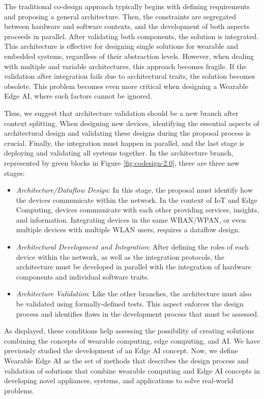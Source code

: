 The traditional co-design approach typically begins with defining requirements and proposing a general architecture. Then, the constraints are segregated between hardware and software contexts, and the development of both aspects proceeds in parallel. After validating both components, the solution is integrated. This architecture is effective for designing single solutions for wearable and embedded systems, regardless of their abstraction levels. However, when dealing with multiple and variable architectures, this approach becomes fragile. If the validation after integration fails due to architectural traits, the solution becomes obsolete. This problem becomes even more critical when designing a Wearable Edge AI, where such factors cannot be ignored.

Thus, we suggest that architecture validation should be a new branch after context splitting. When designing new devices, identifying the essential aspects of architectural design and validating these designs during the proposal process is crucial. Finally, the integration must happen in parallel, and the last stage is deploying and validating all systems together. In the architecture branch, represented by green blocks in Figure \ref{fig:codesign-2.0}, there are three new stages:

\begin{itemize}
    \item \textit{Architecture/Dataflow Design}: In this stage, the proposal must identify how the devices communicate within the network. In the context of IoT and Edge Computing, devices communicate with each other providing services, insights, and information. Integrating devices in the same WBAN/WPAN, or even multiple devices with multiple WLAN users, requires a dataflow design.
    \item \textit{Architectural Development and Integration}: After defining the roles of each device within the network, as well as the integration protocols, the architecture must be developed in parallel with the integration of hardware components and individual software traits.
    \item \textit{Architecture Validation}: Like the other branches, the architecture must also be validated using formally-defined tests. This aspect enforces the design process and identifies flaws in the development process that must be assessed.
\end{itemize}

As displayed, these conditions help assessing the possibility of creating solutions combining the concepts of wearable computing, edge computing, and AI. We have previously studied the development of an Edge AI concept. Now, we define Wearable Edge AI as the set of methods that describes the design process and validation of solutions that combine wearable computing and Edge AI concepts in developing novel appliances, systems, and applications to solve real-world problems.

